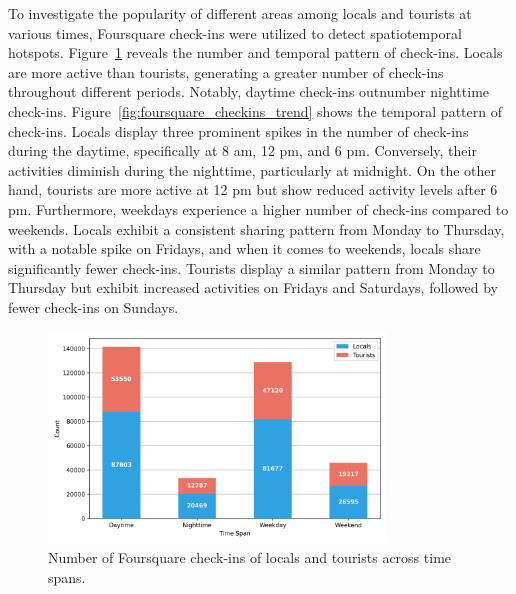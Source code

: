 \documentclass{article}
\theoremstyle{remark}
\begin{document}
To investigate the popularity of different areas among locals and tourists at various times, Foursquare check-ins were utilized to detect spatiotemporal hotspots. Figure~\ref{fig:foursquare_checkins_count} reveals the number and temporal pattern of check-ins. Locals are more active than tourists, generating a greater number of check-ins throughout different periods. Notably, daytime check-ins outnumber nighttime check-ins. Figure~\ref{fig:foursquare_checkins_trend} shows the temporal pattern of check-ins. Locals display three prominent spikes in the number of check-ins during the daytime, specifically at 8 am, 12 pm, and 6 pm. Conversely, their activities diminish during the nighttime, particularly at midnight. On the other hand, tourists are more active at 12 pm but show reduced activity levels after 6 pm. Furthermore, weekdays experience a higher number of check-ins compared to weekends. Locals exhibit a consistent sharing pattern from Monday to Thursday, with a notable spike on Fridays, and when it comes to weekends, locals share significantly fewer check-ins. Tourists display a similar pattern from Monday to Thursday but exhibit increased activities on Fridays and Saturdays, followed by fewer check-ins on Sundays.


\begin{figure}[!h]
\centering
\includegraphics[width=0.8\textwidth]{figures/foursquare_checkins_count.png}
\caption{\label{fig:foursquare_checkins_count}Number of Foursquare check-ins of locals and tourists across time spans.}
\end{figure}
\end{document}
